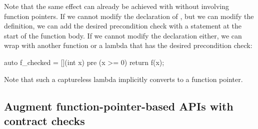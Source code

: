 Note that the same effect can already be achieved with \cite{P2900R8} without involving function pointers. If we cannot modify the declaration of , but we can modify the definition, we can add the desired precondition check with a  statement at the start of the function body. If we cannot modify the declaration either, we can wrap  with another function or a lambda that has the desired precondition check:
\begin{codeblock}
auto f_checked = [](int x) pre (x >= 0) { return f(x); }
\end{codeblock}
Note that such a captureless lambda implicitly converts to a function pointer.


\subsection{Augment function-pointer-based APIs with contract checks}
\label{usecase_api}


